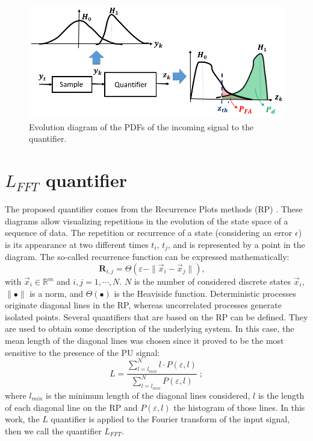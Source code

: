 \documentclass[lettersize,journal]{IEEEtran}
\begin{document}
\begin{figure}[htbp]
    \centerline{\includegraphics[width=\columnwidth]{pdfs.png}}
    \caption{Evolution diagram of the PDFs of the incoming signal to the quantifier.}
    \label{fig:pdfs}
\end{figure}

\section{$L_{FFT}$ quantifier}\label{secRecurrencePlots}
The proposed quantifier comes from the Recurrence Plots methods (RP) \cite{Eckmann1987}. These diagrams allow visualizing repetitions in the evolution of the state space of a sequence of data.
The repetition or recurrence of a state (considering an error $\epsilon$) is its appearance at two different times  $t_i,\,t_j$, and is represented by a point in the diagram.
The so-called recurrence function can be expressed mathematically:
\begin{equation}
    \mathbf{R}_{i,j}=\Theta\left(\varepsilon-\|\overrightarrow{x}_i-
    \overrightarrow{x}_j\|\right),\quad \label{eq:eq_rec}
\end{equation}
with $\overrightarrow{x}_i\in \mathbb{R}^{m}$ and $i,j=1,\cdots,N$. $N$ is the number of considered discrete states $\overrightarrow{x}_i$, $\|\bullet\|$ is a norm, and $\Theta(\bullet)$ is the Heaviside function.
Deterministic processes originate diagonal lines in the RP, whereas uncorrelated processes generate isolated points.
Several quantifiers that are based on the RP can be defined. They are used to obtain some description of the underlying system. 
In this case, the mean length of the diagonal lines was chosen since it proved to be the most sensitive to the presence of the PU signal:
\begin{equation}
    \label{eq:L}
    L=\frac{\sum_{l=l_{min}}^{N} l \cdot P(\varepsilon,l)}{\sum_{l=l_{min}}^{N}P(\varepsilon,l)}\;;
\end{equation}
where $l_{min}$ is the minimum length of the diagonal lines considered, $l$ is the length of each diagonal line on the RP and $P(\varepsilon,l)$ the histogram of those lines.
In this work, the $L$ quantifier is applied to the Fourier transform of the input signal, then we call the quantifier $L_{FFT}$. 
\end{document}
